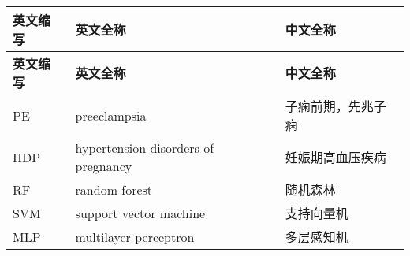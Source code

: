 \cleardoublepage
{}
\begin{center}
    \fontsize{10}{6}
    \begin{longtable}{m{1.6cm}<{\centering}m{7.6cm}<{\centering}m{5.6cm}<{\centering}}
		\hline\hline
            \textbf{英文缩写}&\textbf{英文全称}&\textbf{中文全称}\\
        \hline
        \endfirsthead
        \hline
            \textbf{英文缩写}&\textbf{英文全称}&\textbf{中文全称}\\
        \hline
        \endhead 
        \hline
        \endfoot
        \hline\hline
        \endlastfoot
        PE&preeclampsia&子痫前期，先兆子痫\\
        HDP&hypertension disorders of pregnancy&妊娠期高血压疾病\\
        RF&random forest&随机森林\\
        SVM&support vector machine&支持向量机\\
        MLP&multilayer perceptron&多层感知机\\
	\end{longtable}
\end{center}